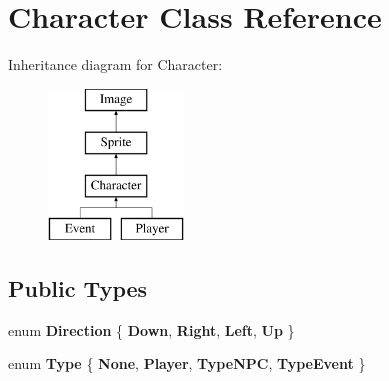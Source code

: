 \hypertarget{classCharacter}{\section{Character Class Reference}
\label{classCharacter}
}
Inheritance diagram for Character\-:\begin{figure}[H]
\begin{center}
\leavevmode
\includegraphics[height=4.000000cm]{classCharacter}
\end{center}
\end{figure}
\subsection*{Public Types}
\begin{DoxyCompactItemize}
\item 
enum {\bfseries Direction} \{ {\bfseries Down}, 
{\bfseries Right}, 
{\bfseries Left}, 
{\bfseries Up}
 \}
\item 
enum {\bfseries Type} \{ {\bfseries None}, 
{\bfseries Player}, 
{\bfseries Type\-N\-P\-C}, 
{\bfseries Type\-Event}
 \}
\end{DoxyCompactItemize}
